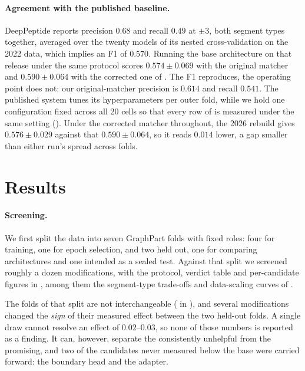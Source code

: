 \documentclass{article}
\begin{document}
\paragraph{Agreement with the published baseline.} DeepPeptide reports precision $0.68$ and recall $0.49$ at $\pm3$, both segment types together, averaged over the twenty models of its nested cross-validation on the 2022 data, which implies an F1 of $0.570$. Running the base architecture on that release under the same protocol scores $0.574\pm0.069$ with the original matcher and $0.590\pm0.064$ with the corrected one of . The F1 reproduces, the operating point does not: our original-matcher precision is $0.614$ and recall $0.541$. The published system tunes its hyperparameters per outer fold, while we hold one configuration fixed across all 20 cells so that every row of  is measured under the same setting (). Under the corrected matcher throughout, the 2026 rebuild gives $0.576\pm0.029$ against that $0.590\pm0.064$, so it reads $0.014$ lower, a gap smaller than either run's spread across folds.


\section{Results}
\label{sec:results}

\paragraph{Screening.} We first split the data into seven GraphPart folds with fixed roles:
four for training, one for epoch selection, and two held out, one for comparing architectures and
one intended as a sealed test.
Against that split we screened roughly a dozen modifications, with the protocol, verdict table and
per-candidate figures in , among them the segment-type
trade-offs and data-scaling curves of .
 
The folds of that split are not interchangeable ( in ), and several modifications changed the
\emph{sign} of their measured effect between the two held-out folds. A single draw cannot resolve an effect of $0.02$--$0.03$, so none of those
numbers is reported as a finding. It can, however, separate the consistently unhelpful
from the promising, and two of the candidates never measured below the base were carried forward:
the boundary head and the adapter.
 
\end{document}
